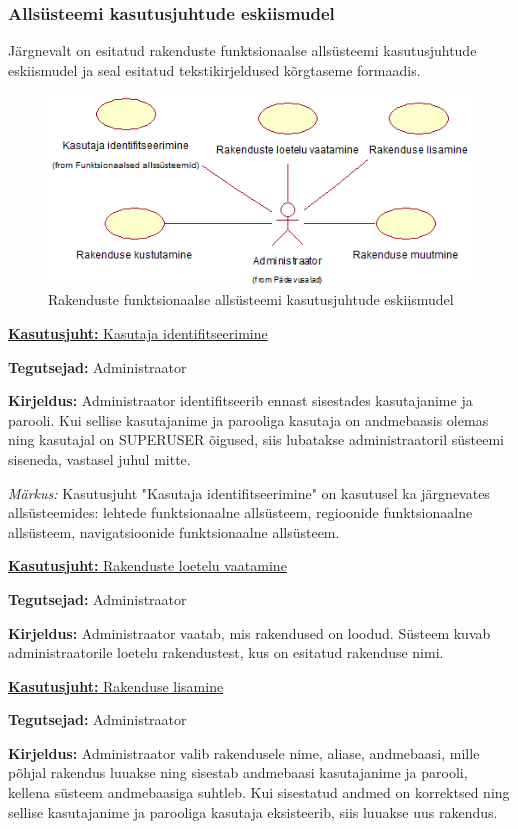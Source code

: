 \documentclass[a4paper,12pt]{article} %
\begin{document}
\subsubsection{Allsüsteemi kasutusjuhtude eskiismudel}
Järgnevalt on esitatud rakenduste funktsionaalse allsüsteemi kasutusjuhtude eskiismudel ja seal esitatud tekstikirjeldused kõrgtaseme formaadis.
\begin{figure}[H]
\begin{center}
\includegraphics[bb=0 0 494 223,scale=1]{./diagrams/applications-subsystem-use-case-digram.png}
\caption{Rakenduste funktsionaalse allsüsteemi kasutusjuhtude eskiismudel}
\end{center}
\end{figure}
\underline{\textbf{Kasutusjuht:} Kasutaja identifitseerimine}
\par
\textbf{Tegutsejad:} Administraator
\par
\textbf{Kirjeldus:} Administraator identifitseerib ennast sisestades kasutajanime ja parooli. Kui sellise kasutajanime ja parooliga kasutaja on andmebaasis olemas ning kasutajal on SUPERUSER õigused, siis lubatakse administraatoril süsteemi siseneda, vastasel juhul mitte.
\par
\textit{Märkus:} Kasutusjuht "Kasutaja identifitseerimine" on kasutusel ka järgnevates allsüsteemides: lehtede funktsionaalne allsüsteem, regioonide funktsionaalne allsüsteem, navigatsioonide funktsionaalne allsüsteem.\par

\underline{\textbf{Kasutusjuht:} Rakenduste loetelu vaatamine}
\par
\textbf{Tegutsejad:} Administraator
\par
\textbf{Kirjeldus:} Administraator vaatab, mis rakendused on loodud. Süsteem kuvab administraatorile loetelu rakendustest, kus on esitatud rakenduse nimi.
\par

\underline{\textbf{Kasutusjuht:} Rakenduse lisamine}
\par
\textbf{Tegutsejad:} Administraator
\par
\textbf{Kirjeldus:} Administraator valib rakendusele nime, aliase, andmebaasi, mille põhjal rakendus luuakse ning sisestab andmebaasi kasutajanime ja parooli, kellena süsteem andmebaasiga suhtleb. Kui sisestatud andmed on korrektsed ning sellise kasutajanime ja parooliga kasutaja eksisteerib, siis luuakse uus rakendus.
\par
\end{document}
